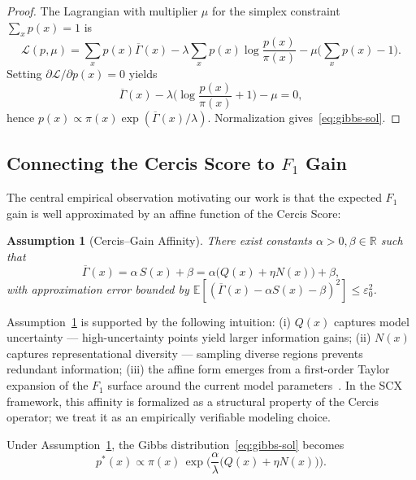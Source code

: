 \documentclass[12pt,a4paper]{article}
\newtheorem{assumption}[theorem]{Assumption}
\newcommand{\R}{\mathbb{R}}
\newcommand{\E}{\mathbb{E}}
\begin{document}
\begin{proof}
The Lagrangian with multiplier $\mu$ for the simplex constraint
$\sum_x p(x)=1$ is
\[
\mathcal{L}(p,\mu) = \sum_x p(x)\overline{\Gamma}(x)
- \lambda\sum_x p(x)\log\frac{p(x)}{\pi(x)}
- \mu\Big(\sum_x p(x)-1\Big).
\]
Setting $\partial\mathcal{L}/\partial p(x)=0$ yields
\[
\overline{\Gamma}(x) - \lambda\big(\log\frac{p(x)}{\pi(x)}+1\big) - \mu = 0,
\]
hence $p(x)\propto\pi(x)\exp(\overline{\Gamma}(x)/\lambda)$.
Normalization gives~\eqref{eq:gibbs-sol}.
\end{proof}

\subsection{Connecting the Cercis Score to $F_1$ Gain}

The central empirical observation motivating our work is that the expected
$F_1$ gain is well approximated by an affine function of the Cercis Score:

\begin{assumption}[Cercis--Gain Affinity]
\label{ass:affinity}
There exist constants $\alpha>0,\beta\in\R$ such that
\begin{equation}\label{eq:affinity}
    \overline{\Gamma}(x) = \alpha\,S(x) + \beta
    = \alpha\big(Q(x)+\eta N(x)\big) + \beta,
\end{equation}
with approximation error bounded by
$\E[(\overline{\Gamma}(x)-\alpha S(x)-\beta)^2]\leq\varepsilon_0^2$.
\end{assumption}

Assumption~\ref{ass:affinity} is supported by the following intuition: (i)
$Q(x)$ captures model uncertainty — high-uncertainty points yield larger
information gains; (ii) $N(x)$ captures representational diversity —
sampling diverse regions prevents redundant information; (iii) the affine
form emerges from a first-order Taylor expansion of the $F_1$ surface around
the current model parameters~\citep{ash2020warm}.  In the SCX framework, this
affinity is formalized as a structural property of the Cercis operator; we
treat it as an empirically verifiable modeling choice.

\medskip\noindent
Under Assumption~\ref{ass:affinity}, the Gibbs distribution~\eqref{eq:gibbs-sol}
becomes
\begin{equation}\label{eq:p-star}
    p^*(x) \propto \pi(x)\,
    \exp\!\Big(\frac{\alpha}{\lambda}\big(Q(x)+\eta N(x)\big)\Big).
\end{equation}
\end{document}
